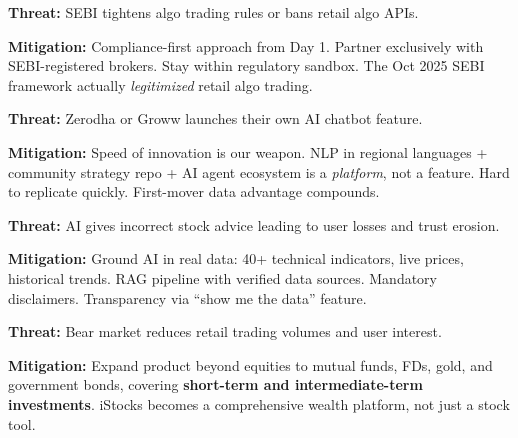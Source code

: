 \documentclass[11pt,a4paper]{article}
\begin{document}
\begin{riskbox}
\textbf{Threat:} SEBI tightens algo trading rules or bans retail algo APIs.\\[0.3em]
\begin{fixbox}
\textcolor{primary}{\textbf{Mitigation:}} Compliance-first approach from Day 1. Partner exclusively with SEBI-registered brokers. Stay within regulatory sandbox. The Oct 2025 SEBI framework actually \textit{legitimized} retail algo trading.
\end{fixbox}
\end{riskbox}

\begin{riskbox}
\textbf{Threat:} Zerodha or Groww launches their own AI chatbot feature.\\[0.3em]
\begin{fixbox}
\textcolor{primary}{\textbf{Mitigation:}} Speed of innovation is our weapon. NLP in regional languages + community strategy repo + AI agent ecosystem is a \textit{platform}, not a feature. Hard to replicate quickly. First-mover data advantage compounds.
\end{fixbox}
\end{riskbox}

\begin{riskbox}
\textbf{Threat:} AI gives incorrect stock advice leading to user losses and trust erosion.\\[0.3em]
\begin{fixbox}
\textcolor{primary}{\textbf{Mitigation:}} Ground AI in real data: 40+ technical indicators, live prices, historical trends. RAG pipeline with verified data sources. Mandatory disclaimers. Transparency via ``show me the data'' feature.
\end{fixbox}
\end{riskbox}

\begin{riskbox}
\textbf{Threat:} Bear market reduces retail trading volumes and user interest.\\[0.3em]
\begin{fixbox}
\textcolor{primary}{\textbf{Mitigation:}} Expand product beyond equities to mutual funds, FDs, gold, and government bonds, covering \textbf{short-term and intermediate-term investments}. iStocks becomes a comprehensive wealth platform, not just a stock tool.
\end{fixbox}
\end{riskbox}
\end{document}
